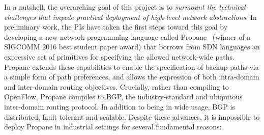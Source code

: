 In a nutshell, the overarching goal of this project is to {\em surmount the technical challenges that impede practical deployment of high-level network abstractions}.  In preliminary work, 
the PIs have taken the first steps toward this goal by developing a
new network programming language called Propane~\cite{beckett+:propane} (winner of a SIGCOMM 2016
best student paper award) that borrows from SDN languages an expressive set of primitives for specifying the allowed network-wide paths.  Propane extends these capabilities to enable the specification of backup paths via a simple form of path preferences, and allows the expression of both intra-domain 
and inter-domain routing objectives.  Crucially, rather than compiling to OpenFlow,
Propane compiles to BGP, the industry-standard and ubiquitous inter-domain routing protocol.  In addition to being in wide usage, BGP is distributed, fault tolerant and scalable.
Despite these advances, it is impossible to deploy Propane in industrial settings for several fundamental reasons:



